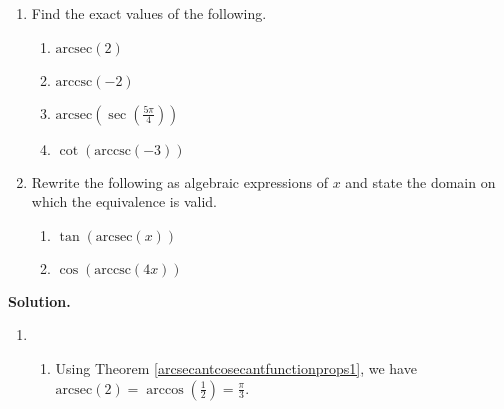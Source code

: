 \begin{ex}  \label{arcsecantcosecantex1} $~$

\begin{enumerate}

\item  Find the exact values of the following.

\begin{multicols}{4}

\begin{enumerate}

\item $\mbox{arcsec}(2)$

\item  $\mbox{arccsc}(-2)$

\item  $\mbox{arcsec}\left( \sec\left( \frac{5\pi}{4} \right) \right)$

\item  $\cot\left(\mbox{arccsc}\left(-3\right)\right)$

\end{enumerate}

\end{multicols}

\item  Rewrite the following as algebraic expressions of $x$ and state the domain on which the equivalence is valid.

\begin{multicols}{2}

\begin{enumerate}

\item  $\tan(\mbox{arcsec}(x))$

\item  $\cos(\mbox{arccsc}(4x))$ 

\end{enumerate}

\end{multicols}

\end{enumerate}

\newpage

{\bf Solution.}

\begin{enumerate}

\item

\begin{enumerate}

\item Using Theorem \ref{arcsecantcosecantfunctionprops1}, we have $\mbox{arcsec}(2) = \arccos\left(\frac{1}{2}\right) = \frac{\pi}{3}$.


\end{enumerate}
\end{enumerate}
\end{ex}
